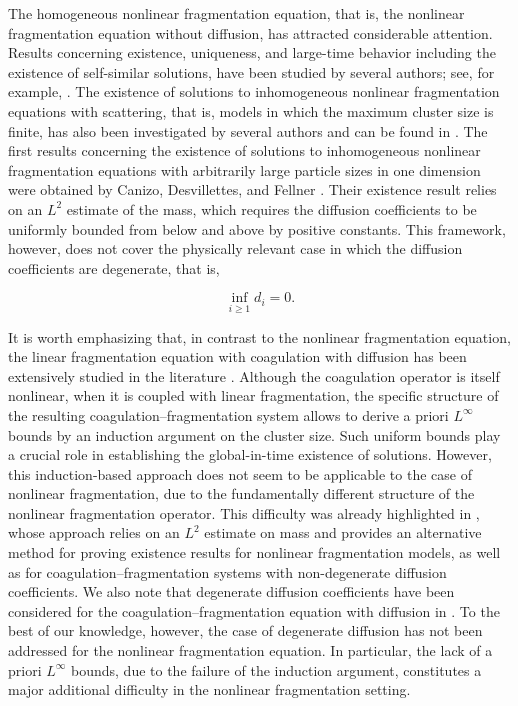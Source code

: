 \documentclass[a4paper,12pt,reqno]{amsart}
\theoremstyle{plain}
\numberwithin{equation}{section}
\begin{document}
	The homogeneous nonlinear fragmentation equation, that is, the nonlinear
	fragmentation equation without diffusion, has attracted considerable attention.
	Results concerning existence, uniqueness, and large-time behavior including the
	existence of self-similar solutions, have been studied by several authors; see, for
	example, \cite{ali2024well, ali2024note, ali2024, ali2025, ernst2007, zheng2005,
		laurencot2001, kostoglou2000, GL22021, JA2025, GJL2024, barik2020, barik2020global,
		barik2021, barik2021existence, GL12021}.
	The existence of solutions to inhomogeneous nonlinear fragmentation equations with
	scattering, that is, models in which the maximum cluster size is finite, has also
	been investigated by several authors and can be found in
	\cite{amann2005local, walker2004discrete, walker2005new}.
	The first results concerning the existence of solutions to inhomogeneous nonlinear
	fragmentation equations with arbitrarily large particle sizes in one dimension were
	obtained by Canizo, Desvillettes, and Fellner \cite{canizo2010regularity}. Their
	existence result relies on an $L^2$ estimate of the mass, which requires the diffusion
	coefficients to be uniformly bounded from below and above by positive constants.
	This framework, however, does not cover the physically relevant case in which the
	diffusion coefficients are degenerate, that is,
	
	\[
	\inf_{i \ge 1} d_i = 0.
	\]
	
	It is worth emphasizing that, in contrast to the nonlinear fragmentation equation,
	the linear fragmentation equation with coagulation with diffusion has been extensively studied in the
	literature \cite{wrzosek2002, laurenccot2002, laurencot2002continuous}. Although the coagulation operator is itself nonlinear, when it is
	coupled with linear fragmentation, the specific structure of the resulting
	coagulation--fragmentation system allows to derive a priori
	$L^\infty$ bounds by an induction argument on the cluster size. Such uniform bounds
	play a crucial role in establishing the global-in-time existence of solutions. However, this induction-based approach does not seem to be applicable to the case
	of nonlinear fragmentation, due to the fundamentally different structure of the
	nonlinear fragmentation operator. This difficulty was already highlighted in \cite{canizo2010regularity}, whose approach relies on an $L^2$ estimate on mass and provides an alternative method for proving existence results for
	nonlinear fragmentation models, as well as for coagulation--fragmentation systems
	with non-degenerate diffusion coefficients. We also note that degenerate diffusion coefficients have been considered for the
	coagulation--fragmentation equation with diffusion in \cite{canizo2010absence}. To the best of our knowledge, however, the case of degenerate diffusion
	has not been addressed for the nonlinear fragmentation equation. In particular,
	the lack of a priori $L^\infty$ bounds, due to the failure of the induction
	argument, constitutes a major additional difficulty in the nonlinear
	fragmentation setting.
	
\end{document}
